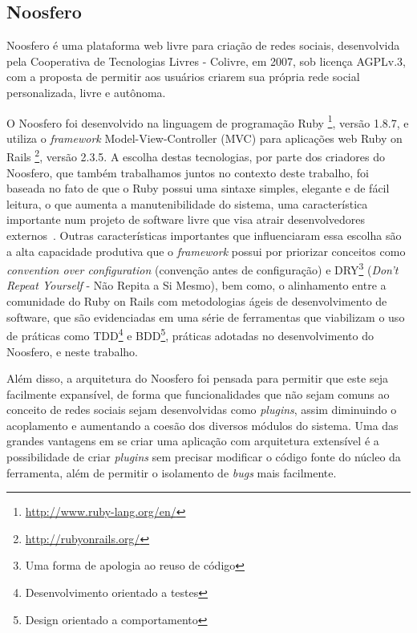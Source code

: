 \documentclass[12pt]{article}
\begin{document}
\subsection{Noosfero}

Noosfero é uma plataforma web livre para criação de redes sociais,
desenvolvida pela Cooperativa de Tecnologias Livres - Colivre, em 2007, sob
licença AGPLv.3, com a proposta de permitir aos usuários criarem sua própria
rede social personalizada, livre e autônoma.

O Noosfero foi desenvolvido na linguagem de programação Ruby%
\footnote{\url{http://www.ruby-lang.org/en/}},
versão 1.8.7, e utiliza o \textit{framework} Model-View-Controller (MVC) para
aplicações web Ruby on Rails%
\footnote{\url{http://rubyonrails.org/}}, versão 2.3.5.
%
A escolha destas tecnologias, por parte dos criadores do Noosfero, que também
trabalhamos juntos no contexto deste trabalho,
foi baseada no fato de que o Ruby possui uma sintaxe
simples, elegante e de fácil leitura, o que aumenta a manutenibilidade do sistema,
uma característica importante num projeto de software livre que visa atrair
desenvolvedores externos~\cite{meirelles2013}.
%
Outras características importantes que influenciaram essa escolha são a alta
capacidade produtiva que o \textit{framework} possui por priorizar conceitos como
\textit{convention over configuration} (convenção antes de configuração)
e DRY\footnote{Uma forma de apologia ao reuso de código}
(\textit{Don't Repeat Yourself} - Não Repita a Si Mesmo), bem como, o alinhamento
entre a comunidade do Ruby on Rails com metodologias ágeis de
desenvolvimento de software, que são evidenciadas em uma série de ferramentas que
viabilizam o uso de práticas como TDD\footnote{Desenvolvimento orientado a testes}
e BDD\footnote{Design orientado a comportamento}, práticas adotadas no
desenvolvimento do Noosfero, e neste trabalho.

Além disso, a arquitetura do Noosfero foi pensada para permitir que este seja facilmente
expansível, de forma que funcionalidades que não sejam comuns ao conceito de
redes sociais sejam desenvolvidas como \textit{plugins}, assim diminuindo
o acoplamento e aumentando a coesão dos diversos módulos do sistema.
%
Uma das grandes vantagens em se criar uma aplicação com arquitetura extensível
é a possibilidade de criar \textit{plugins} sem precisar modificar o código
fonte do núcleo da ferramenta, além de permitir o isolamento de \textit{bugs}
mais facilmente.
\end{document}

